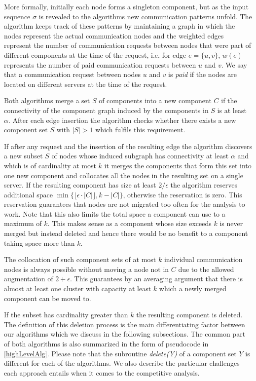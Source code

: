 \documentclass[a4paper,xcolor=dvipsnames, tikz, 12pt]{article}
\theoremstyle{definition}
\begin{document}
	More formally, initially each node forms a singleton component, but as the input sequence $\sigma$ is revealed to the algorithms new communication patterns unfold. The algorithm keeps track of these patterns by maintaining a graph in which the nodes represent the actual communication nodes and the weighted edges represent the number of communication requests between nodes that were part of different components at the time of the request, i.e. for edge $e=\{u,v\}$, $w(e)$ represents the number of paid communication requests between $u$ and $v$. We say that a communication request between nodes $u$ and $v$ is \textit{paid} if the nodes are located on different servers at the time of the request.
	
	Both algorithms merge a set $S$ of components into a new component $C$ if the connectivity of the component graph induced by the components in $S$ is at least $\alpha$. After each edge insertion the algorithm checks whether there exists a new component set $S$ with $|S|>1$ which fulfils this requirement.
	
	If after any request and the insertion of the resulting edge the algorithm discovers a new subset $S$ of nodes whose induced subgraph has connectivity at least $\alpha$ and which is of cardinality at most $k$ it merges the components that form this set into one new component and collocates all the nodes in the resulting set on a single server. If the resulting component has size at least $2/\epsilon$ the algorithm reserves additional space $\min\{\lfloor\epsilon\cdot|C|\rfloor,k-|C|\}$, otherwise the reservation is zero. This reservation guarantees that nodes are not migrated too often for the analysis to work. Note that this also limits the total space a component can use to a maximum of $k$. This makes sense as a component whose size exceeds $k$ is never merged but instead deleted and hence there would be no benefit to a component taking space more than $k$.
	
	The collocation of such component sets of at most $k$ individual communication nodes is always possible without moving a node not in $C$ due to the allowed augmentation of $2+\epsilon$. This guarantees by an averaging argument that there is almost at least one cluster with capacity at least $k$ which a newly merged component can be moved to.
	
	If the subset has cardinality greater than $k$ the resulting component is deleted. The definition of this deletion process is the main differentiating factor between our algorithms which we discuss in the following subsections. The common part of both algorithms is also summarized in the form of pseudocode in \cref{highLevelAlg}. Please note that the subroutine \textit{delete(Y)} of a component set $Y$ is different for each of the algorithms. We also describe the particular challenges each approach entails when it comes to the competitive analysis.
	
\end{document}
